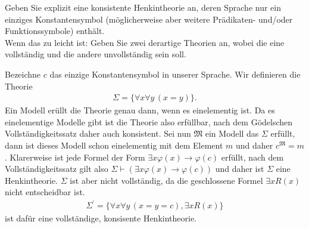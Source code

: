 
\begin{exercise}[138]

Geben Sie explizit eine konsistente Henkintheorie an, deren Sprache nur ein
einziges Konstantensymbol (möglicherweise aber weitere Prädikaten- und/oder
Funktionssymbole) enthält. \\
Wenn das zu leicht ist: Geben Sie zwei derartige Theorien an, wobei die eine
vollständig und die andere unvollständig sein soll.

\end{exercise}


\begin{solution}
Bezeichne $c$ das einzige Konstantensymbol in unserer Sprache. Wir definieren die Theorie
\begin{align*}
  \Sigma = \{\forall x \forall y\, (x = y)\}.
\end{align*}
Ein Modell erüllt die Theorie genau dann, wenn es einelementig ist. Da es einelementige Modelle gibt ist die Theorie also erfüllbar, nach dem Gödelschen Vollständigkeitssatz daher auch konsistent. Sei nun $\mathfrak{M}$ ein Modell das $\Sigma$ erfüllt, dann ist dieses Modell schon einelementig mit dem Element $m$ und daher $c^{\mathfrak{M}} = m$. Klarerweise ist jede Formel der Form $\exists x \varphi(x) \rightarrow \varphi(c)$ erfüllt, nach dem Vollständigkeitssatz gilt also $\Sigma \vdash (\exists x \varphi(x) \rightarrow \varphi(c))$ und daher ist $\Sigma$ eine Henkintheorie.
$\Sigma$ ist aber nicht vollständig,
da die geschlossene Formel $\exists x R(x)$ nicht entscheidbar ist.
\begin{align*}
  \Sigma^{\prime} = \{\forall x \forall y\, (x = y = c), \exists x R(x)\}
\end{align*}
ist dafür eine vollständige, konsisente Henkintheorie.
\end{solution}

